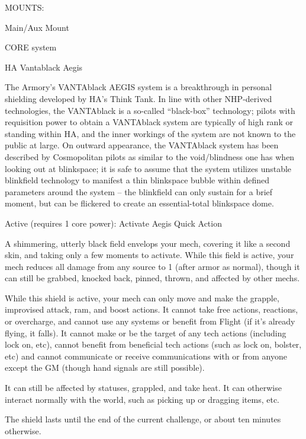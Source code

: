                                                  MOUNTS:

 Main/Aux Mount

                                               CORE system




                                                HA Vantablack Aegis

 The Armory’s VANTAblack AEGIS system is a breakthrough in personal shielding developed by HA’s
 Think Tank. In line with other NHP-derived technologies, the VANTAblack is a so-called ``black-box''
 technology; pilots with requisition power to obtain a VANTAblack system are typically of high rank or
 standing within HA, and the inner workings of the system are not known to the public at large. On
 outward appearance, the VANTAblack system has been described by Cosmopolitan pilots as similar to
 the void/blindness one has when looking out at blinkspace; it is safe to assume that the system utilizes
 unstable blinkfield technology to manifest a thin blinkspace bubble within defined parameters around
 the system -- the blinkfield can only sustain for a brief moment, but can be flickered to create an
 essential-total blinkspace dome.

 Active (requires 1 core power): Activate Aegis
 Quick Action

 A shimmering, utterly black field envelops your mech, covering it like a second skin, and taking only a
 few moments to activate. While this field is active, your mech reduces all damage from any source to 1
 (after armor as normal), though it can still be grabbed, knocked back, pinned, thrown, and affected by
 other mechs.


 While this shield is active, your mech can only move and make the grapple, improvised attack, ram,
 and boost actions. It cannot take free actions, reactions, or overcharge, and cannot use any systems or
 benefit from Flight (if it’s already flying, it falls). It cannot make or be the target of any tech actions
 (including lock on, etc), cannot benefit from beneficial tech actions (such as lock on, bolster, etc) and
 cannot communicate or receive communications with or from anyone except the GM (though hand
 signals are still possible).


  It can still be affected by statuses, grappled, and take heat. It can otherwise interact normally with the
 world, such as picking up or dragging items, etc.


 The shield lasts until the end of the current challenge, or about ten minutes otherwise.

